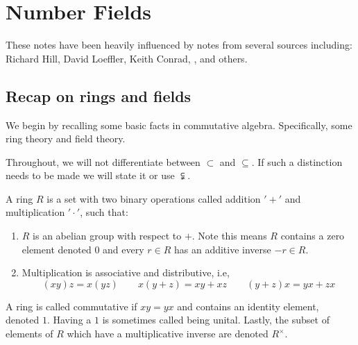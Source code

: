 \maketitle



\chapter{Number Fields}

These notes have been heavily influenced by notes from several sources including: Richard Hill, David Loeffler, Keith Conrad, \cite{marcus},\cite{Samuel} and others.

\section{Recap on rings and fields}
We begin by recalling some basic facts in commutative algebra. Specifically, some ring theory and field theory.	


\begin{rmrk*}
	Throughout, we will not differentiate between $\subset$ and $\subseteq$. If such a distinction needs to be made we will state it or use $\subsetneqq$. 
\end{rmrk*}

\begin{defn}
\label{is_ring}

	A ring $R$ is a set with two binary operations called addition $'+'$ and multiplication $'\cdot'$, such that:
	
	\begin{enumerate}
		\item $R$ is an abelian group with respect to  $+$. Note this means $R$ contains a zero element denoted $0$ and every $r \in R$ has an additive inverse $-r \in R$.
		\item Multiplication is associative and distributive, i.e, \[(xy)z=x(yz) \qquad x(y+z)=xy+xz \qquad (y+z)x=yx+zx\]
	\end{enumerate}
	A ring is called commutative if $xy=yx$ and contains an identity element, denoted $1$. Having a $1$ is sometimes called being unital. Lastly, the subset of elements of $R$ which have a multiplicative inverse are denoted $R^\times$.
	
\end{defn}





